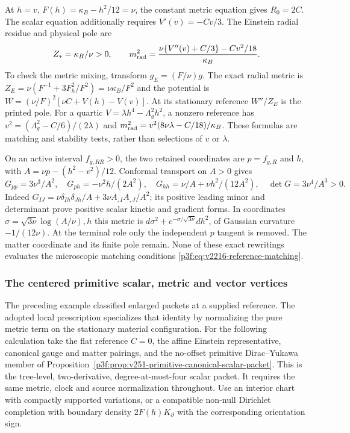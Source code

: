 \documentclass[11pt,a4paper]{article}
\begin{document}
At $h=v$, $F(h)=\kappa_B-h^2/12=\nu$, the constant metric equation
gives $R_0=2C$.  The scalar equation additionally requires
$V'(v)=-Cv/3$.  The Einstein radial residue and physical pole are
\[
 Z_*={\kappa_B}/{\nu}>0,\qquad
 m_{\rm rad}^2=
 \frac{\nu\{V''(v)+C/3\}-Cv^2/18}{\kappa_B}.
\]
To check the metric mixing, transform $g_E=(F/\nu)g$.
The exact radial metric is
$Z_E=\nu(F^{-1}+3F_h^2/F^2)=\nu\kappa_B/F^2$ and the
potential is $W=(\nu/F)^2[\nu C+V(h)-V(v)]$.
At its stationary reference $W''/Z_E$ is the printed pole.
For a quartic $V=\lambda h^4-\Lambda_g^2h^2$, a nonzero reference
has $v^2=(\Lambda_g^2-C/6)/(2\lambda)$ and
$m_{\rm rad}^2=v^2(8\nu\lambda-C/18)/\kappa_B$.
These formulas are matching and stability tests, rather than selections
of $v$ or $\lambda$.

On an active interval $f_{g,RR}>0$, the two retained coordinates are
$p=f_{g,R}$ and $h$, with
$A=\nu p-(h^2-v^2)/12$.  Conformal transport on $A>0$ gives
\[
 G_{pp}=3\nu^3/A^2,\quad
 G_{ph}=-\nu^2h/(2A^2),\quad
 G_{hh}=\nu/A+\nu h^2/(12A^2),\quad
 \det G=3\nu^4/A^3>0.
\]
Indeed $G_{IJ}=\nu\delta_{Ih}\delta_{Jh}/A+
3\nu A_{,I}A_{,J}/A^2$; its positive leading minor and determinant
prove positive scalar kinetic and gradient forms.  In coordinates
$\sigma=\sqrt{3\nu}\log(A/\nu),h$ this metric is
$d\sigma^2+e^{-\sigma/\sqrt{3\nu}}dh^2$, of Gaussian curvature
$-1/(12\nu)$.  At the terminal role only the independent $p$ tangent
is removed.  The matter coordinate and its finite pole remain.
None of these exact rewritings evaluates the microscopic matching
conditions \eqref{p3f:eq:v2216-reference-matching}.


\subsubsection{The centered primitive scalar, metric and vector vertices}
\label{p3g:sec:v3041-centered-radial}
The preceding example classified enlarged packets at a supplied reference.
The adopted local prescription specializes that identity by normalizing the
pure metric term on the stationary material configuration.  For the
following calculation take the flat reference \(C=0\), the affine Einstein
representative, canonical gauge and matter pairings, and the no-offset
primitive Dirac--Yukawa member of
Proposition~\ref{p3f:prop:v251-primitive-canonical-scalar-packet}.
This is the tree-level, two-derivative, degree-at-most-four scalar packet.
It requires the same metric, clock and source normalization throughout.
Use an interior chart with compactly supported variations, or a compatible
non-null Dirichlet completion with boundary density
\(2F(h)K_{\partial}\) with the corresponding orientation sign.
\end{document}
